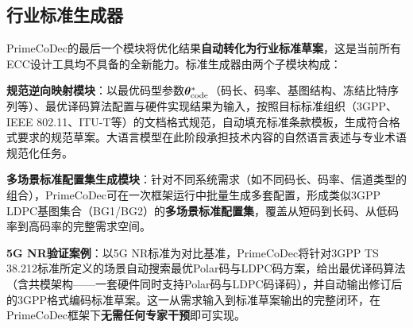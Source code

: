 \subsection{行业标准生成器}\label{sec:std_gen}

PrimeCoDec的最后一个模块将优化结果\textbf{自动转化为行业标准草案}，这是当前所有ECC设计工具均不具备的全新能力。标准生成器由两个子模块构成：

\textbf{规范逆向映射模块}：以最优码型参数$\bm{\theta}_{\mathrm{code}}^*$（码长、码率、基图结构、冻结比特序列等）、最优译码算法配置与硬件实现结果为输入，按照目标标准组织（3GPP、IEEE 802.11、ITU-T等）的文档格式规范，自动填充标准条款模板，生成符合格式要求的规范草案。大语言模型在此阶段承担技术内容的自然语言表述与专业术语规范化任务。

\textbf{多场景标准配置集生成模块}：针对不同系统需求（如不同码长、码率、信道类型的组合），PrimeCoDec可在一次框架运行中批量生成多套配置，形成类似3GPP LDPC基图集合（BG1/BG2）的\textbf{多场景标准配置集}，覆盖从短码到长码、从低码率到高码率的完整需求空间。

\textbf{5G NR验证案例}：以5G NR标准为对比基准，PrimeCoDec将针对3GPP TS 38.212标准\cite{3gpp38212}所定义的场景自动搜索最优Polar码与LDPC码方案，给出最优译码算法（含共模架构——一套硬件同时支持Polar码与LDPC码译码），并自动输出修订后的3GPP格式编码标准草案。这一从需求输入到标准草案输出的完整闭环，在PrimeCoDec框架下\textbf{无需任何专家干预}即可实现。